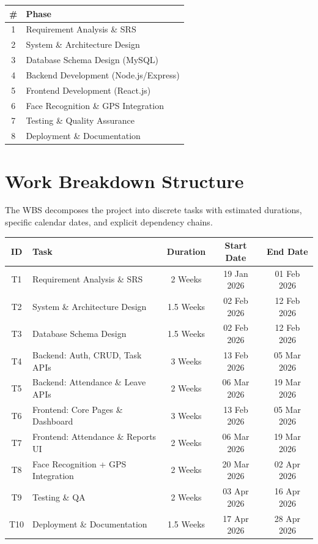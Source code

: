 \documentclass[12pt,a4paper]{article}
\begin{document}
\begin{center}
\begin{tabular}{cl}
\toprule
\textbf{\#} & \textbf{Phase} \\
\midrule
1 & Requirement Analysis \& SRS \\
2 & System \& Architecture Design \\
3 & Database Schema Design (MySQL) \\
4 & Backend Development (Node.js/Express) \\
5 & Frontend Development (React.js) \\
6 & Face Recognition \& GPS Integration \\
7 & Testing \& Quality Assurance \\
8 & Deployment \& Documentation \\
\bottomrule
\end{tabular}
\end{center}

\section{Work Breakdown Structure}
The WBS decomposes the project into discrete tasks with estimated durations, specific calendar dates, and explicit dependency chains.

\bigskip
\begin{center}
\small
\begin{tabularx}{\textwidth}{c X c c c}
\toprule
\textbf{ID} & \textbf{Task} & \textbf{Duration} & \textbf{Start Date} & \textbf{End Date} \\
\midrule
T1 & Requirement Analysis \& SRS & 2 Weeks & 19 Jan 2026 & 01 Feb 2026 \\
T2 & System \& Architecture Design & 1.5 Weeks & 02 Feb 2026 & 12 Feb 2026 \\
T3 & Database Schema Design & 1.5 Weeks & 02 Feb 2026 & 12 Feb 2026 \\
T4 & Backend: Auth, CRUD, Task APIs & 3 Weeks & 13 Feb 2026 & 05 Mar 2026 \\
T5 & Backend: Attendance \& Leave APIs & 2 Weeks & 06 Mar 2026 & 19 Mar 2026 \\
T6 & Frontend: Core Pages \& Dashboard & 3 Weeks & 13 Feb 2026 & 05 Mar 2026 \\
T7 & Frontend: Attendance \& Reports UI & 2 Weeks & 06 Mar 2026 & 19 Mar 2026 \\
T8 & Face Recognition + GPS Integration & 2 Weeks & 20 Mar 2026 & 02 Apr 2026 \\
T9 & Testing \& QA & 2 Weeks & 03 Apr 2026 & 16 Apr 2026 \\
T10 & Deployment \& Documentation & 1.5 Weeks & 17 Apr 2026 & 28 Apr 2026 \\
\bottomrule
\end{tabularx}
\end{center}
\end{document}
